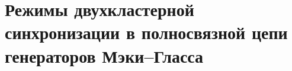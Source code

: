 \chapter{Режимы двухкластерной синхронизации в полносвязной цепи генераторов Мэки--Гласса}\label{ch:ch3}

\clearpage
